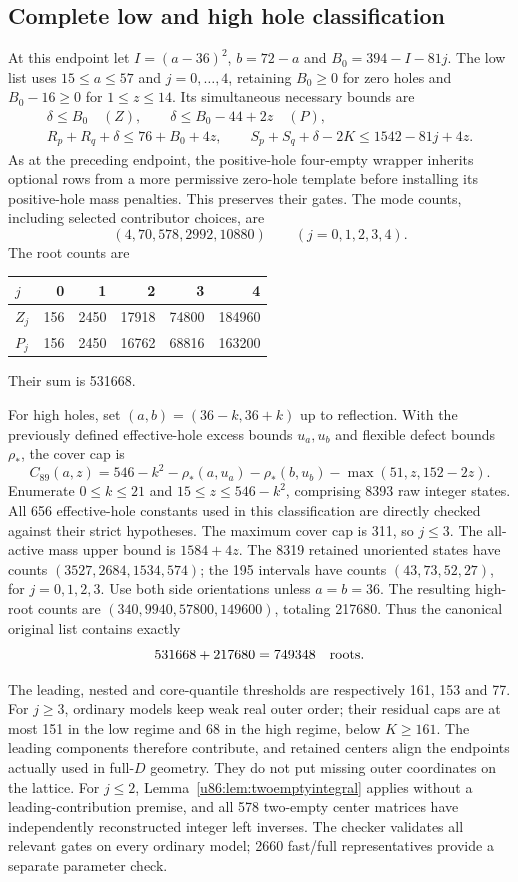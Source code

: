 \documentclass[11pt,a4paper]{article}
\theoremstyle{remark}
\begin{document}
\subsection{Complete low and high hole classification}
At this endpoint let $I=(a-36)^2$, $b=72-a$ and
$B_0=394-I-81j$. The low list uses $15\le a\le57$ and
$j=0,\ldots,4$, retaining $B_0\ge0$ for zero holes and
$B_0-16\ge0$ for $1\le z\le14$. Its simultaneous necessary bounds are
\begin{gather*}
 \delta\le B_0\quad(Z),\qquad
 \delta\le B_0-44+2z\quad(P),\\
 R_p+R_q+\delta\le76+B_0+4z,\qquad
 S_p+S_q+\delta-2K\le1542-81j+4z.
\end{gather*}
As at the preceding endpoint, the positive-hole four-empty wrapper
inherits optional rows from a more permissive zero-hole template before
installing its positive-hole mass penalties. This preserves their gates.
The mode counts, including selected contributor choices, are
\[
 (4,70,578,2992,10880)\qquad(j=0,1,2,3,4).
\]
The root counts are
\begin{center}\small
\begin{tabular}{lrrrrr}
\toprule
$j$&0&1&2&3&4\\\midrule
$Z_j$&156&2450&17918&74800&184960\\
$P_j$&156&2450&16762&68816&163200\\\bottomrule
\end{tabular}
\end{center}
Their sum is 531668.

For high holes, set $(a,b)=(36-k,36+k)$ up to reflection. With the
previously defined effective-hole excess bounds $u_a,u_b$ and flexible
defect bounds $\rho_*$, the cover cap is
\[
 C_{89}(a,z)=546-k^2-\rho_*(a,u_a)-\rho_*(b,u_b)
                         -\max(51,z,152-2z).
\]
Enumerate $0\le k\le21$ and $15\le z\le546-k^2$, comprising 8393
raw integer states. All 656 effective-hole constants used in this
classification are directly checked against their strict hypotheses.
The maximum cover cap is 311, so $j\le3$.
The all-active mass upper bound is $1584+4z$.
The 8319 retained unoriented states have counts
$(3527,2684,1534,574)$; the 195 intervals have counts
$(43,73,52,27)$, for $j=0,1,2,3$.
Use both side orientations unless $a=b=36$.
The resulting high-root counts are
$(340,9940,57800,149600)$, totaling 217680.
Thus the canonical original list contains exactly
\[
 531668+217680=749348\quad\hbox{roots}.
\]

The leading, nested and core-quantile thresholds are respectively
161, 153 and 77. For $j\ge3$, ordinary models keep weak real outer
order; their residual caps are at most 151 in the low regime and 68 in
the high regime, below $K\ge161$. The leading components therefore
contribute, and retained centers align the endpoints actually used in
full-$D$ geometry. They do not put missing outer coordinates on the
lattice. For $j\le2$, Lemma~\ref{u86:lem:twoemptyintegral} applies without
a leading-contribution premise, and all 578 two-empty center matrices
have independently reconstructed integer left inverses.
The checker validates all relevant gates on every ordinary model;
2660 fast/full representatives provide a separate parameter check.
\end{document}
